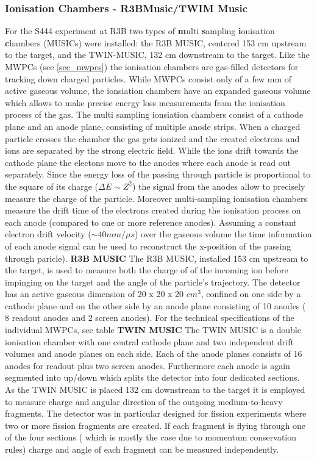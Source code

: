 \subsubsection{Ionisation Chambers - R3BMusic/TWIM Music}
For the S444 experiment at R3B two types of \textbf{m}ulti \textbf{s}ampling \textbf{i}onisation \textbf{c}hambers (MUSICs) were installed: the R3B MUSIC, centered 153 cm upstream to the target, and the TWIN-MUSIC, 132 cm downstream to the target. Like the MWPCs (see \ref{sec_mwpcs}) the ionisation chambers are gas-filled detectors for tracking down charged particles. While MWPCs consist only of a few mm of active gaseous volume, the ionsiation chambers have an expanded gaseous volume which allows to make precise energy loss measurements from the ionisation process of the gas. The multi sampling ionsiation chambers consist of a cathode plane and an anode plane, consisting of multiple anode strips. When a charged particle crosses the chamber the gas gets ionized and the created electrons and ions are separated by the strong electric field. While the ions drift towards the cathode plane the electons move to the anodes where each anode is read out separately. Since the energy loss of the passing through particle is proportional to the square of its charge ($\Delta E \sim Z^2$) the signal from the anodes allow to precisely measure the charge of the particle. Moreover multi-sampling ionisation chambers measure the drift time of the electrons created during the ionisation process  on each anode (compared to one or more reference anodes). Assuming a constant electron drift velocity ($\sim 40 mm/\mu s$) over the gaseous volume the time information of each anode signal can be used to reconstruct the x-position of the passing through paricle).\newline
\textbf{R3B MUSIC}\newline
The R3B MUSIC, installed 153 cm upstream to the target, is used to measure both the  charge of of the incoming ion before impinging on the target and the angle of the particle's trajectory. The detector has an active gaseous dimension of 20 x 20 x 20 $cm^3$, confined on one side by a cathode plane and on the other side by an anode plane consisting of 10 anodes ( 8 readout anodes and 2 screen anodes). For the technical specifications of the individual MWPCs, see table %
\textbf{TWIN MUSIC}\newline
The TWIN MUSIC is a double ionisation chamber with one central cathode plane and two independent drift volumes and anode planes on each side. Each of the anode planes consists of 16 anodes for readout plus two screen anodes. Furthermore each anode is again segmented into up/down which splits the detector into four dedicated sections. As the TWIN MUSIC is placed 132 cm downstream to the target it is employed to measure charge and angular direction of the outgoing medium-to-heavy fragments. The detector was in particular designed for fission experiments where two or more fission fragments are created. If each fragment is flying through one of the four sections ( which is mostly the case due to momentum conservation rules) charge and angle of each fragment can be measured independently.\newline
